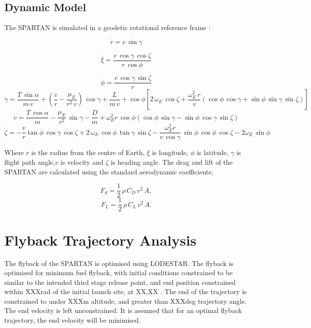 \documentclass[conf]{new-aiaa}
\begin{document}
\subsection{Dynamic Model}

The SPARTAN is simulated in a geodetic rotational reference frame \cite{Josselyn2002a}: 

\begin{equation}
\dot{r} = v \, \sin \gamma
\end{equation}

\begin{equation}
\dot{\xi} = \frac{v \, \cos \gamma \, \cos \zeta}{r \, \cos \phi}
\end{equation}

\begin{equation}
\dot{\phi} = \frac{v\,\cos\gamma\,\sin\zeta}{r}
\end{equation}
\begin{equation}
\dot{\gamma} = \frac{T\,\sin\alpha}{m\,v}+ (\frac{v}{r}-\frac{\mu_E}{r^2 \,v})\,\cos\gamma + \frac{L}{m\,v}
+ \cos\phi[2\,\omega_E\, \cos\zeta + \frac{\omega_E^2\, r}{v}(\cos\phi\,\cos\gamma+\sin\phi\,\sin\gamma\,\sin\zeta)]
\end{equation}
\begin{equation}
\dot{v} = \frac{T\,\cos\alpha}{m}-\frac{\mu_E}{r^2}\,\sin\gamma - \frac{D}{m}
+ \omega_E^2 r\,\cos\phi(\cos\phi\,\sin\gamma-\sin\phi\,\cos\gamma\,\sin\zeta)
\end{equation}
\begin{equation}
\dot{\zeta} = -\frac{v}{r}\tan\phi\,\cos\gamma\,\cos\zeta +2\,\omega_E\,\cos\phi\,\tan\gamma\,\sin\zeta - \frac{\omega_E^2 r}{v\,\cos\gamma}\,\sin\phi \, \cos\phi\,\cos\zeta-2\omega_E\,\sin\phi 
\end{equation}

Where $r$ is the radius from the centre of Earth, $\xi$ is longitude, $\phi$ is latitude, $\gamma$ is flight path angle,$v$ is velocity and $\zeta$ is heading angle. The drag and lift of the SPARTAN are calculated using the standard aerodynamic coefficients;

\begin{equation}
F_d = \frac{1}{2} \, \rho \, C_D \, v^2 \, A ,
\end{equation}
\begin{equation}
F_L = \frac{1}{2} \, \rho \, C_L \, v^2 \, A .
\end{equation}

\section{Flyback Trajectory Analysis}
The flyback of the SPARTAN is optimised using LODESTAR. The flyback is optimised for minimum fuel flyback, with initial conditions constrained to be similar to the intended third stage release point, and end position constrained within XXXrad of the initial launch site, at XX,XX .  
The end of the trajectory is constrained to under XXXm altitude, and greater than XXXdeg trajectory angle. The end velocity is left unconstrained. It is assumed that for an optimal flyback trajectory, the end velocity will be minimised. 
\end{document}
